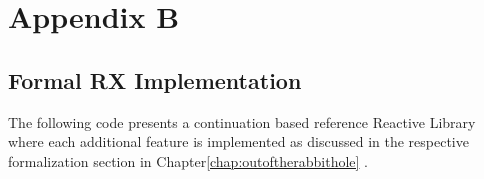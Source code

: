 %
%

\chapter{Appendix B}
\label{app:b}

\section{Formal RX Implementation}

The following code presents a continuation based reference Reactive Library where each additional feature is implemented as discussed in the respective formalization section in Chapter\ref{chap:outoftherabbithole} .


